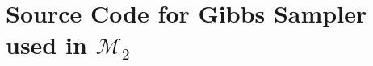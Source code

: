 \documentclass{../../tex_template/asaproc}
\newcommand{\M}{\mathcal{M}}
\begin{document}

\newpage
\section{Source Code for Gibbs Sampler used in $\M_2$}

\end{document}
